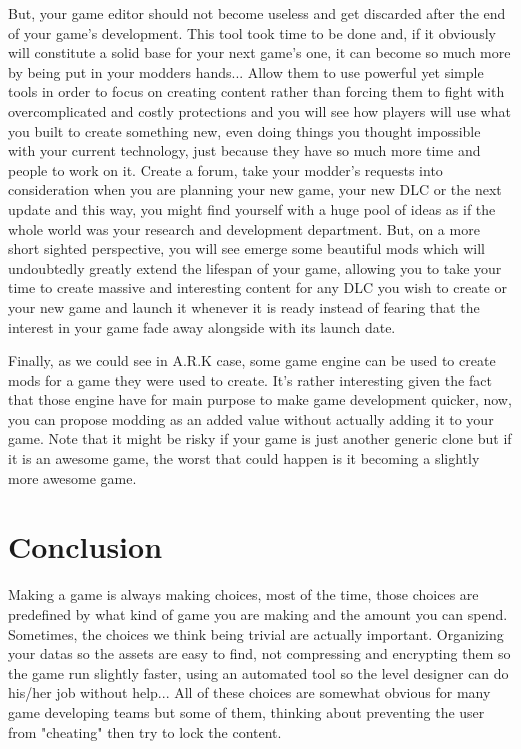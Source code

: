 \documentclass[a4paper,12pt]{article}
\begin{document}
But, your game editor should not become useless and get discarded after the end of your game's development. This tool took time to be done and, if it obviously will constitute a solid base for your next game's one, it can become so much more by being put in your modders hands... Allow them to use powerful yet simple tools in order to focus on creating content rather than forcing them to fight with overcomplicated and costly protections and you will see how players will use what you built to create something new, even doing things you thought impossible with your current technology, just because they have so much more time and people to work on it. Create a forum, take your modder's requests into consideration when you are planning your new game, your new DLC or the next update and this way, you might find yourself with a huge pool of ideas as if the whole world was your research and development department. But, on a more short sighted perspective, you will see emerge some beautiful mods which will undoubtedly greatly extend the lifespan of your game, allowing you to take your time to create massive and interesting content for any DLC you wish to create or your new game and launch it whenever it is ready instead of fearing that the interest in your game fade away alongside with its launch date.

Finally, as we could see in A.R.K case, some game engine can be used to create mods for a game they were used to create. It's rather interesting given the fact that those engine have for main purpose to make game development quicker, now, you can propose modding as an added value without actually adding it to your game. Note that it might be risky if your game is just another generic clone but if it is an awesome game, the worst that could happen is it becoming a slightly more awesome game.

\newpage
\section{Conclusion}

Making a game is always making choices, most of the time, those choices are predefined by what kind of game you are making and the amount you can spend. Sometimes, the choices we think being trivial are actually important. Organizing your datas so the assets are easy to find, not compressing and encrypting them so the game run slightly faster, using an automated tool so the level designer can do his/her job without help... All of these choices are somewhat obvious for many game developing teams but some of them, thinking about preventing the user from "cheating" then try to lock the content.
\end{document}
